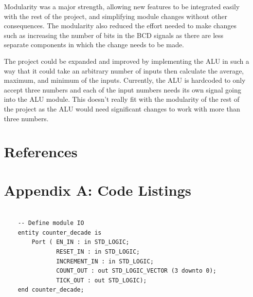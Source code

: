 \documentclass[11pt]{article}
\newenvironment{code}{\captionsetup{type=listing}}{}
\begin{document}
Modularity was a major strength, allowing new features to be integrated easily with the rest of the project, and simplifying module changes without other consequences. The modularity also reduced the effort needed to make changes such as increasing the number of bits in the BCD signals as there are less separate components in which the change needs to be made.

The project could be expanded and improved by implementing the ALU in such a way that it could take an arbitrary number of inputs then calculate the average, maximum, and minimum of the inputs. Currently, the ALU is hardcoded to only accept three numbers and each of the input numbers needs its own signal going into the ALU module. This doesn't really fit with the modularity of the rest of the project as the ALU would need significant changes to work with more than three numbers.

\newpage

\section{References}
\printbibliography

\newpage

\section{Appendix A: Code Listings}

\begin{code}
	\begin{verbatim}
  
    -- Define module IO
    entity counter_decade is
        Port ( EN_IN : in STD_LOGIC;
               RESET_IN : in STD_LOGIC;
               INCREMENT_IN : in STD_LOGIC;
               COUNT_OUT : out STD_LOGIC_VECTOR (3 downto 0);
               TICK_OUT : out STD_LOGIC);
    end counter_decade;

  \end{verbatim}
	\captionsetup{belowskip=0pt}
	\label{code:entity_naming_convention}
\end{code}
\end{document}
